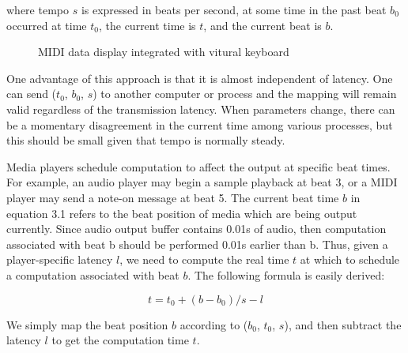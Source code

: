 where tempo $s$ is expressed in beats per second, at some time in the past beat $b_0$
occurred at time $t_0$, the current time is $t$, and the current beat is $b$.

\begin{figure}[H]
\caption{MIDI data display integrated with vitural keyboard}
\label{fig:speciation}
\end{figure}

One advantage of this approach is that it is almost independent of latency.
One can send ($t_0$, $b_0$, $s$) to another computer or process and the mapping will remain
valid regardless of the transmission latency. When parameters change,
there can be a momentary disagreement in the current time among various
processes, but this should be small given that tempo is normally steady.

Media players schedule computation to affect the output at specific beat
times. For example, an audio player may begin a sample playback at beat 3, or a
MIDI player may send a note-on message at beat 5. The current beat time $b$ in 
equation 3.1
refers to the beat position of media which are being output currently.
Since audio output buffer contains 0.01s of audio, then computation associated with
beat b should be performed 0.01s earlier than b. Thus, given a player-specific latency
$l$, we need to compute the real time $t$ at which to schedule a computation associated
with beat $b$. The following formula is easily derived:

\begin{equation}
t = t_0 + (b - b_0) / s - l
\end{equation}

We simply map the beat position $b$ according to ($b_0$, $t_0$, $s$), and then subtract the
latency $l$ to get the computation time $t$.


